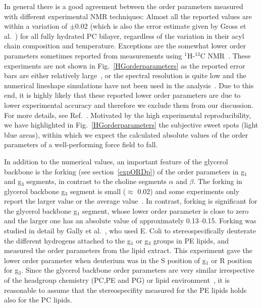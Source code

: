 \documentclass[journal=jpcbfk,manuscript=article]{achemso}
\begin{document}
In general there is a good agreement between the order parameters measured with different experimental NMR techniques: Almost all the 
reported values are within a variation of $\pm$0.02 (which is also the error estimate given by Gross et al.~\cite{gross97}) 
for all fully hydrated PC bilayer, regardless of the variation in their acyl chain composition and temperature.
Exceptions are the somewhat lower order parameters sometimes reported from measurements using $^1$H-$^{13}$C NMR~\cite{hong95a,hong95b,warschawski05}.
These experiments are not shown in Fig.~\ref{HGorderparameters} as the reported error bars are either relatively large~\cite{hong95a,hong95b}, 
or the spectral resolution is quite low and the numerical lineshape simulations have not been used in the analysis~\cite{warschawski05}.
Due to this end, it is highly likely that these reported lower order parameters are due to lower experimental 
accuracy and therefore we exclude them from our discussion. 
For more details, see Ref.~. 
Motivated by the high experimental reproducibility, we have highlighted in 
Fig.~\ref{HGorderparameters} the subjective sweet spots (light blue areas), within which we expect the calculated absolute 
values of the order parameters of a well-performing force field to fall.

In addition to the numerical values, an important feature of the glycerol backbone is the 
forking (see section~\ref{expORDp}) of the order parameters in g$_1$ and g$_3$ segments, in contrast to the choline segments $\alpha$ and $\beta$. 
The forking in glycerol backbone g$_3$ segment is small ($\approx$ 0.02) 
and some experiments only report the larger value or the average value~\cite{akutsu81,ferreira13}. 
In contrast, forking is significant for the glycerol backbone g$_1$ segment, whose lower order parameter is close to zero and the
larger one has an absolute value of approximately 0.13--0.15. Forking was studied in detail by Gally et al.~\cite{gally81}, who used E. Coli to 
stereospecifically deuterate the different hydrogens attached to the g$_1$ or g$_3$ groups in PE lipids, and measured the order parameters from the lipid 
extract. This experiment gave the lower order parameter when deuterium was in the S position of g$_1$ or R position for g$_3$.
Since the glycerol backbone order parameters are very similar irrespective of the headgroup chemistry (PC,PE and PG) or lipid 
environment~\cite{gally81}, it is reasonable to assume that the stereospecifity measured for the PE lipids
holds also for the PC lipids.
\end{document}
